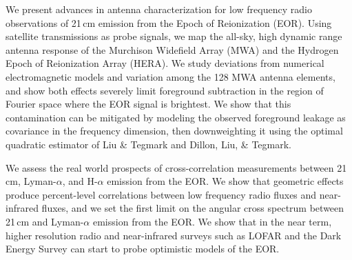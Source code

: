 We present advances in antenna characterization for low frequency radio observations of 21\,cm emission from the Epoch of Reionization (EOR). Using satellite transmissions as probe signals, we map the all-sky, high dynamic range antenna response of the Murchison Widefield Array (MWA) and the Hydrogen Epoch of Reionization Array (HERA). We study deviations from numerical electromagnetic models and variation among the 128 MWA antenna elements, and show both effects severely limit foreground subtraction in the region of Fourier space where the EOR signal is brightest. We show that this contamination can be mitigated by modeling the observed foreground leakage as covariance in the frequency dimension, then downweighting it using the optimal quadratic estimator of Liu \& Tegmark and Dillon, Liu, \& Tegmark.

We assess the real world prospects of cross-correlation measurements between 21\,cm, Lyman-$\alpha$, and H-$\alpha$ emission from the EOR. We show that geometric effects produce percent-level correlations between low frequency radio fluxes and near-infrared fluxes, and we set the first limit on the angular cross spectrum between 21\,cm and Lyman-$\alpha$ emission from the EOR. We show that in the near term, higher resolution radio and near-infrared surveys such as LOFAR and the Dark Energy Survey can start to probe optimistic models of the EOR.

